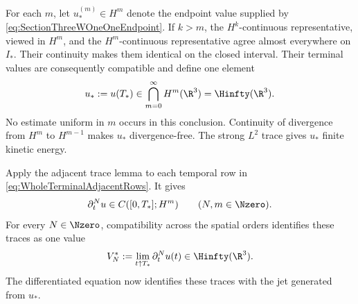 For each \(m\), let \(u_*^{(m)}\in H^m\) denote the endpoint value supplied by \eqref{eq:SectionThreeWOneOneEndpoint}.
If \(k>m\), the \(H^k\)-continuous representative, viewed in \(H^m\), and the \(H^m\)-continuous representative agree almost everywhere on \(I_*\).
Their continuity makes them identical on the closed interval.
Their terminal values are consequently compatible and define one element
\begin{equation}\label{eq:SectionThreeCommonEndpoint}
  u_*:=u(T_*)
  \in\bigcap_{m=0}^{\infty}H^m(\R^3)
  =\Hinfty(\R^3).
\end{equation}
No estimate uniform in \(m\) occurs in this conclusion.
Continuity of divergence from \(H^m\) to \(H^{m-1}\) makes \(u_*\) divergence-free.
The strong \(L^2\) trace gives \(u_*\) finite kinetic energy.

Apply the adjacent trace lemma to each temporal row in \eqref{eq:WholeTerminalAdjacentRows}.
It gives
\[
  \partial_t^N u\in C([0,T_*];H^m)
  \qquad(N,m\in\Nzero).
\]
For every \(N\in\Nzero\), compatibility across the spatial orders identifies these traces as one value
\begin{equation}\label{eq:SectionThreeVelocityJetTraces}
  V_N^*
  :=\lim_{t\uparrow T_*}\partial_t^N u(t)
  \in\Hinfty(\R^3).
\end{equation}
The differentiated equation now identifies these traces with the jet generated from \(u_*\).


